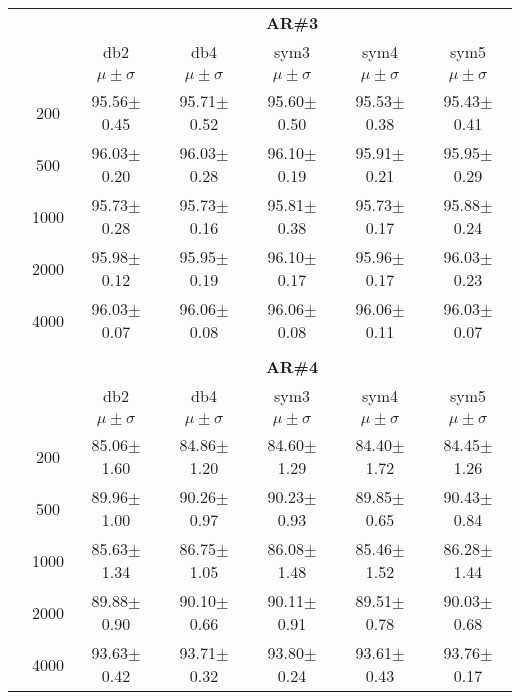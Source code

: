 \begin{table}[H]
\begin{tabular}{|c|c|c c c c c|}

\cline{3-7}
\multicolumn{2}{c|}{\multirow{3}{*}{}} & \multicolumn{5}{c|}{\textbf{AR\#3}}   \\\cline{3-7} 
\multicolumn{2}{c|}{}  & db2 & db4 & sym3 & sym4 & sym5 \\\cline{3-7}%
\multicolumn{2}{c|}{}& $\mu \pm \sigma$ & $\mu \pm \sigma$ & $\mu \pm \sigma$ & $\mu \pm \sigma$ & $\mu \pm \sigma$ \\\hline

\multicolumn{1}{|c|}{ \multirow{5}{*}{\rotatebox[origin=c]{90}{\textbf{Neurônios}}} }
&200	&95.56$\pm$0.45	&95.71$\pm$0.52	&95.60$\pm$0.50	&95.53$\pm$0.38	&95.43$\pm$0.41	\\\cline{2-7}
&500	&96.03$\pm$0.20	&96.03$\pm$0.28	&96.10$\pm$0.19	&95.91$\pm$0.21	&95.95$\pm$0.29	\\\cline{2-7}
&1000	&95.73$\pm$0.28	&95.73$\pm$0.16	&95.81$\pm$0.38	&95.73$\pm$0.17	&95.88$\pm$0.24	\\\cline{2-7}
&2000	&95.98$\pm$0.12	&95.95$\pm$0.19	&96.10$\pm$0.17	&95.96$\pm$0.17	&96.03$\pm$0.23	\\\cline{2-7}
&4000	&96.03$\pm$0.07	&96.06$\pm$0.08	&96.06$\pm$0.08	&96.06$\pm$0.11	&96.03$\pm$0.07

\\\midrule

\multicolumn{7}{c}{}\\ 



\cline{3-7}
\multicolumn{2}{c|}{\multirow{3}{*}{}} & \multicolumn{5}{c|}{\textbf{AR\#4}}   \\\cline{3-7} 
\multicolumn{2}{c|}{}  & db2 & db4 & sym3 & sym4 & sym5 \\\cline{3-7}%
\multicolumn{2}{c|}{}& $\mu \pm \sigma$ & $\mu \pm \sigma$ & $\mu \pm \sigma$ & $\mu \pm \sigma$ & $\mu \pm \sigma$ \\\hline
\multicolumn{1}{|c|}{ \multirow{5}{*}{\rotatebox[origin=c]{90}{\textbf{Neurônios}}} }
&200	&85.06$\pm$1.60	&84.86$\pm$1.20	&84.60$\pm$1.29	&84.40$\pm$1.72 &84.45$\pm$1.26	\\\cline{2-7}
&500	&89.96$\pm$1.00	&90.26$\pm$0.97	&90.23$\pm$0.93	&89.85$\pm$0.65	&90.43$\pm$0.84	\\\cline{2-7}
&1000	&85.63$\pm$1.34	&86.75$\pm$1.05	&86.08$\pm$1.48	&85.46$\pm$1.52	&86.28$\pm$1.44 \\\cline{2-7}
&2000	&89.88$\pm$0.90	&90.10$\pm$0.66	&90.11$\pm$0.91	&89.51$\pm$0.78	&90.03$\pm$0.68	\\\cline{2-7}
&4000	&93.63$\pm$0.42	&93.71$\pm$0.32	&93.80$\pm$0.24	&93.61$\pm$0.43	&93.76$\pm$0.17	


 \\\midrule
\end{tabular}
\end{table}





